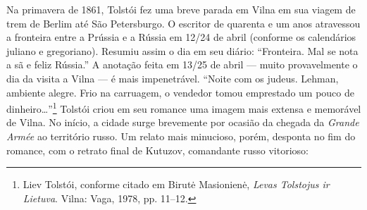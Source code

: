 Na primavera de 1861, Tolstói fez uma breve parada em Vilna em sua
viagem de trem de Berlim até São Petersburgo. O escritor de quarenta e
um anos atravessou a fronteira entre a Prússia e a Rússia em 12/24 de
abril (conforme os calendários juliano e gregoriano). Resumiu assim o
dia em seu diário: ``Fronteira. Mal se nota a sã e feliz Rússia.'' A
anotação feita em 13/25 de abril --- muito provavelmente o dia da visita a
Vilna --- é mais impenetrável. ``Noite com os judeus. Lehman, ambiente
alegre. Frio na carruagem, o vendedor tomou emprestado um pouco de
dinheiro\ldots{}''\footnote{Liev Tolstói, conforme citado em Birutė Masionienė, \textit{Levas Tolstojus ir Lietuva}. Vilna: Vaga, 1978, pp. 11--12.} Tolstói criou em seu romance uma imagem mais extensa e memorável de Vilna. No início, a cidade surge brevemente por ocasião da
chegada da \textit{Grande Armée} ao território russo. Um relato mais
minucioso, porém, desponta no fim do romance, com o retrato final de
Kutuzov, comandante russo vitorioso:

